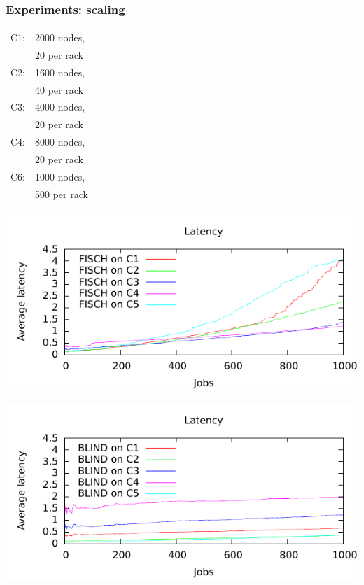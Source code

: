 \documentclass{beamer}
\begin{document}
\begin{frame}
  \frametitle{ Experiments: scaling}
    \begin{minipage}{0.3\linewidth}
    \begin{tabular}{ll}
    C1: & 2000 nodes,\\
        & 20 per rack\\
    C2: & 1600 nodes,\\
        & 40 per rack\\
    C3: & 4000 nodes,\\
        & 20 per rack\\
    C4: & 8000 nodes,\\
        & 20 per rack\\
    C6: & 1000 nodes,\\
        & 500 per rack
    \end{tabular}
    \end{minipage}
    \begin{minipage}{0.65\linewidth}
    \includegraphics[scale=0.7]{latency_fisch}

    \includegraphics[scale=0.7]{latency_blind}
    \end{minipage}
\end{frame}
\end{document}
